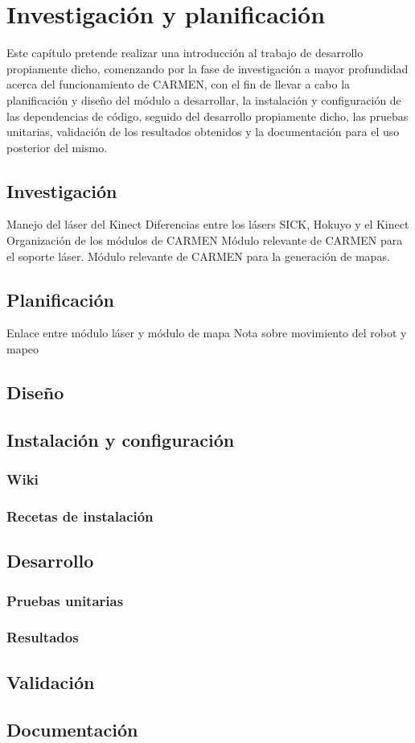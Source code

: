 \chapter{Investigación y planificación}

Este capítulo pretende realizar una introducción al trabajo de desarrollo propiamente dicho, comenzando por la fase de investigación a mayor profundidad acerca del funcionamiento de CARMEN, con el fin de llevar a cabo la planificación y diseño del módulo a desarrollar, la instalación y configuración de las dependencias de código, seguido del desarrollo propiamente dicho, las pruebas unitarias, validación de los resultados obtenidos y la documentación para el uso posterior del mismo.

\section{Investigación}

Manejo del láser del Kinect
Diferencias entre los lásers SICK, Hokuyo y el Kinect
Organización de los módulos de CARMEN
Módulo relevante de CARMEN para el soporte láser.
Módulo relevante de CARMEN para la generación de mapas.

\section{Planificación}

Enlace entre módulo láser y módulo de mapa
Nota sobre movimiento del robot y mapeo

\section{Diseño}

\section{Instalación y configuración}

\subsection{Wiki}

\subsection{Recetas de instalación}

\section{Desarrollo}

\subsection{Pruebas unitarias}

\subsection{Resultados}

\section{Validación}

\section{Documentación}
